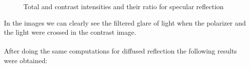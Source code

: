 \documentclass[english]{article}
\begin{document}
\begin{figure}[H]
	\centering
	\caption{Total and contrast intensities and their ratio for specular reflection}
	\label{fig:ten}
\end{figure}
In the images we can clearly see the filtered glare of light when the polarizer and the light were crossed in the contrast image.\\
\\
After doing the same computations for diffused reflection the following results were obtained:
\end{document}
